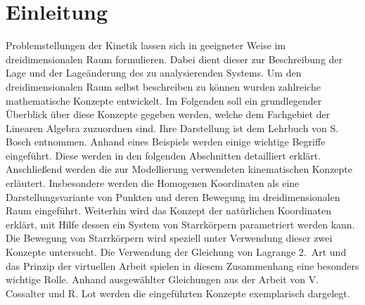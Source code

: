 \chapter{Einleitung}
Problemstellungen der Kinetik lassen sich in geeigneter Weise im dreidimensionalen Raum formulieren. Dabei dient dieser zur Beschreibung der Lage und der Lage\"anderung des zu analysierenden Systems. \newline
Um den dreidimensionalen Raum selbst beschreiben zu k\"onnen wurden zahlreiche mathematische Konzepte entwickelt. Im Folgenden soll ein grundlegender \"Uberblick \"uber diese Konzepte gegeben werden, welche dem Fachgebiet der Linearen Algebra zuzuordnen sind. Ihre Darstellung ist dem Lehrbuch von S. Bosch \cite{Bosch2014} entnommen. Anhand eines Beispiels werden einige wichtige Begriffe eingef\"uhrt. Diese werden in den folgenden Abschnitten detailliert erkl\"art. 
Anschlie\ss{}end werden die zur Modellierung verwendeten kinematischen Konzepte erl\"autert. Insbesondere werden die Homogenen Koordinaten als eine Darstellungsvariante von Punkten und deren Bewegung im dreidimensionalen Raum eingef\"uhrt. Weiterhin wird das Konzept der nat\"urlichen Koordinaten erkl\"art, mit Hilfe dessen ein System von Starrk\"orpern parametriert werden kann. Die Bewegung von Starrk\"orpern wird speziell unter Verwendung dieser zwei Konzepte untersucht. Die Verwendung der Gleichung von Lagrange \mbox{2. Art} und das Prinzip der virtuellen Arbeit spielen in diesem Zusammenhang eine besonders wichtige Rolle. Anhand ausgew\"ahlter Gleichungen aus der Arbeit von V. Cossalter und R. Lot \cite{Cossalter2002} werden die eingef\"uhrten Konzepte exemplarisch dargelegt.

